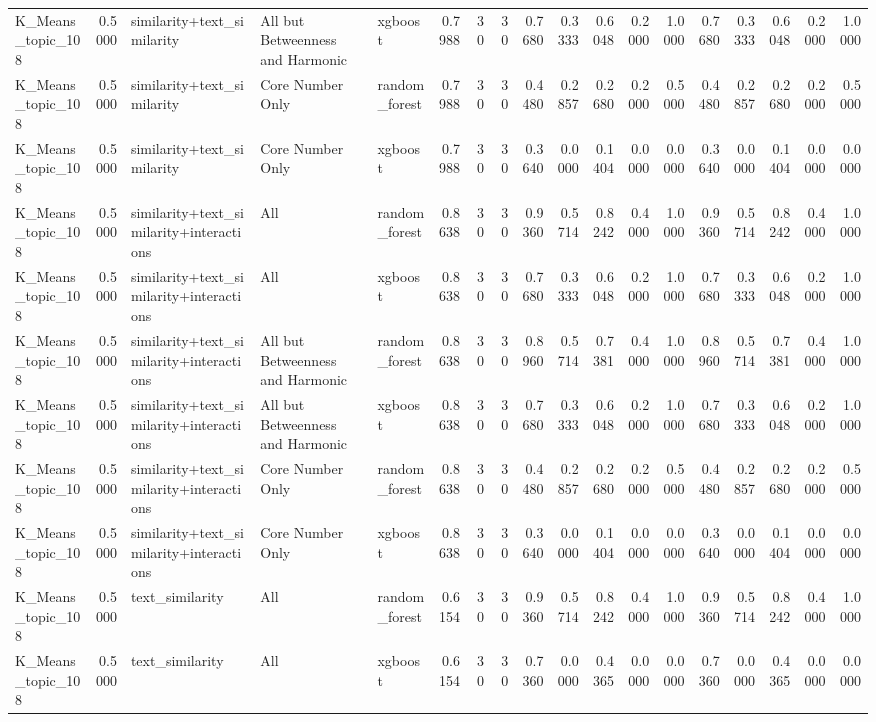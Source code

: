\begin{tabular}{lrlllrrrrrrrrrrrrr}
K_Means_topic_108 & 0.5000 & similarity+text_similarity & All but Betweenness and Harmonic & xgboost & 0.7988 & 30 & 30 & 0.7680 & 0.3333 & 0.6048 & 0.2000 & 1.0000 & 0.7680 & 0.3333 & 0.6048 & 0.2000 & 1.0000 \\
K_Means_topic_108 & 0.5000 & similarity+text_similarity & Core Number Only & random_forest & 0.7988 & 30 & 30 & 0.4480 & 0.2857 & 0.2680 & 0.2000 & 0.5000 & 0.4480 & 0.2857 & 0.2680 & 0.2000 & 0.5000 \\
K_Means_topic_108 & 0.5000 & similarity+text_similarity & Core Number Only & xgboost & 0.7988 & 30 & 30 & 0.3640 & 0.0000 & 0.1404 & 0.0000 & 0.0000 & 0.3640 & 0.0000 & 0.1404 & 0.0000 & 0.0000 \\
K_Means_topic_108 & 0.5000 & similarity+text_similarity+interactions & All & random_forest & 0.8638 & 30 & 30 & 0.9360 & 0.5714 & 0.8242 & 0.4000 & 1.0000 & 0.9360 & 0.5714 & 0.8242 & 0.4000 & 1.0000 \\
K_Means_topic_108 & 0.5000 & similarity+text_similarity+interactions & All & xgboost & 0.8638 & 30 & 30 & 0.7680 & 0.3333 & 0.6048 & 0.2000 & 1.0000 & 0.7680 & 0.3333 & 0.6048 & 0.2000 & 1.0000 \\
K_Means_topic_108 & 0.5000 & similarity+text_similarity+interactions & All but Betweenness and Harmonic & random_forest & 0.8638 & 30 & 30 & 0.8960 & 0.5714 & 0.7381 & 0.4000 & 1.0000 & 0.8960 & 0.5714 & 0.7381 & 0.4000 & 1.0000 \\
K_Means_topic_108 & 0.5000 & similarity+text_similarity+interactions & All but Betweenness and Harmonic & xgboost & 0.8638 & 30 & 30 & 0.7680 & 0.3333 & 0.6048 & 0.2000 & 1.0000 & 0.7680 & 0.3333 & 0.6048 & 0.2000 & 1.0000 \\
K_Means_topic_108 & 0.5000 & similarity+text_similarity+interactions & Core Number Only & random_forest & 0.8638 & 30 & 30 & 0.4480 & 0.2857 & 0.2680 & 0.2000 & 0.5000 & 0.4480 & 0.2857 & 0.2680 & 0.2000 & 0.5000 \\
K_Means_topic_108 & 0.5000 & similarity+text_similarity+interactions & Core Number Only & xgboost & 0.8638 & 30 & 30 & 0.3640 & 0.0000 & 0.1404 & 0.0000 & 0.0000 & 0.3640 & 0.0000 & 0.1404 & 0.0000 & 0.0000 \\
K_Means_topic_108 & 0.5000 & text_similarity & All & random_forest & 0.6154 & 30 & 30 & 0.9360 & 0.5714 & 0.8242 & 0.4000 & 1.0000 & 0.9360 & 0.5714 & 0.8242 & 0.4000 & 1.0000 \\
K_Means_topic_108 & 0.5000 & text_similarity & All & xgboost & 0.6154 & 30 & 30 & 0.7360 & 0.0000 & 0.4365 & 0.0000 & 0.0000 & 0.7360 & 0.0000 & 0.4365 & 0.0000 & 0.0000 \\

\end{tabular}
